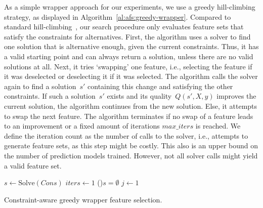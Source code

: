 \documentclass{article}
\theoremstyle{definition}
\begin{document}
As a simple wrapper approach for our experiments, we use a greedy hill-climbing strategy, as displayed in Algorithm~\ref{al:afs:greedy-wrapper}.
Compared to standard hill-climbing~\cite{kohavi1997wrappers}, our search procedure only evaluates feature sets that satisfy the constraints for alternatives.
First, the algorithm uses a solver to find one solution that is alternative enough, given the current constraints.
Thus, it has a valid starting point and can always return a solution, unless there are no valid solutions at all.
Next, it tries `swapping' one feature, i.e., selecting the feature if it was deselected or deselecting it if it was selected.
The algorithm calls the solver again to find a solution~$s'$ containing this change and satisfying the other constraints.
If such a solution~$s'$ exists and its quality~$Q(s',X,y)$ improves the current solution, the algorithm continues from the new solution.
Else, it attempts to swap the next feature.
The algorithm terminates if no swap of a feature leads to an improvement or a fixed amount of iterations $max\_iters$ is reached.
We define the iteration count as the number of calls to the solver, i.e., attempts to generate feature sets, as this step might be costly.
This also is an upper bound on the number of prediction models trained.
However, not all solver calls might yield a valid feature set.

\begin{algorithm}[htb]
	\DontPrintSemicolon
	\BlankLine
	$s \leftarrow \text{Solve}(Cons)$ 
	$iters \leftarrow 1$ 
	\If(){$s = \emptyset$}{
		\Return{$\emptyset$}
	}
	$j \leftarrow 1$ 
	\caption{Constraint-aware greedy wrapper feature selection.}
	\label{al:afs:greedy-wrapper}
\end{algorithm}
\end{document}
